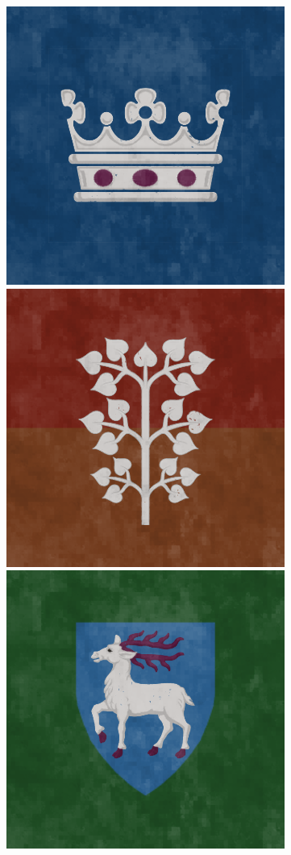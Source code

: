 \begin{figure}[!ht]
        \includegraphics[scale=0.25]{img/flag/idc.png}
        \includegraphics[scale=0.25]{img/flag/locals.png}
        \includegraphics[scale=0.25]{img/flag/lormark.png}

\end{figure}
